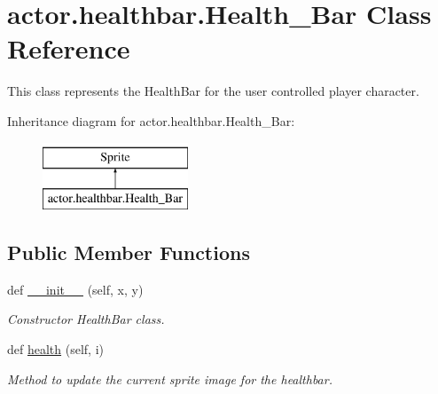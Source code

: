 \hypertarget{classactor_1_1healthbar_1_1_health___bar}{}\section{actor.\+healthbar.\+Health\+\_\+\+Bar Class Reference}
\label{classactor_1_1healthbar_1_1_health___bar}


This class represents the Health\+Bar for the user controlled player character.  


Inheritance diagram for actor.\+healthbar.\+Health\+\_\+\+Bar\+:\begin{figure}[H]
\begin{center}
\leavevmode
\includegraphics[height=2.000000cm]{classactor_1_1healthbar_1_1_health___bar}
\end{center}
\end{figure}
\subsection*{Public Member Functions}
\begin{DoxyCompactItemize}
\item 
def \hyperlink{classactor_1_1healthbar_1_1_health___bar_a1f35a409c7e1fc7d36600891b7a4a796}{\+\_\+\+\_\+init\+\_\+\+\_\+} (self, x, y)
\begin{DoxyCompactList}\small\item\em Constructor Health\+Bar class. \end{DoxyCompactList}\item 
def \hyperlink{classactor_1_1healthbar_1_1_health___bar_a13d9c179f223a080426841ed336407b5}{health} (self, i)
\begin{DoxyCompactList}\small\item\em Method to update the current sprite image for the healthbar. \end{DoxyCompactList}\end{DoxyCompactItemize}
